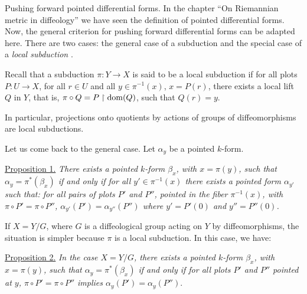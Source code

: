 \begin{Article}{Pushing forward pointed differential forms.}{}
  In the chapter ``On Riemannian metric in diffeology'' we have seen the definition of pointed differential forms.
  Now,
  the general criterion for pushing forward differential forms can be adapted here.
  There are two cases:
  the general %
  case of a subduction and the special case of a \emph{local subduction} \cite[\textsection\,2.16]{PIZ13}.
  
  Recall that a subduction $\pi \colon Y \to X$ is said to be a local subduction if for all plots $P \colon U \to X$,
  for all $r \in U$ and all $y \in \pi^{-1}(x)$,
  $x = P(r)$,
  there exists a local lift $Q$ in $Y$,
  that is,
  $\pi \circ Q = P \restriction \mathrm{dom}(Q)$,
  such that $Q(r) = y$.
  
  In particular,
  projections onto quotients by actions of groups of diffeomorphisms are local subductions.
  
  Let us come back to the general case.
  Let $\alpha_y$ be a pointed $k$-form.
  
  \uline{Proposition 1.} {\itshape There exists a pointed $k$-form $\beta_x$,
  with $x = \pi(y)$,
  such that $\alpha_y = \pi^*(\beta_x)$ if and only if for all $y' \in \pi^{-1}(x)$ there exists a pointed form $\alpha_{y'}$ such that:
  for all pairs of plots $P'$ and $P''$,
  pointed in the fiber $\pi^{-1}(x)$,
  with $\pi \circ P' = \pi \circ P''$,
  $\alpha_{y'}(P') = \alpha_{y''}(P'')$ where $y' = P'(0)$ and $y'' = P''(0)$.}
  
  If $X = Y/G$,
  where $G$ is a diffeological group acting on $Y$ by diffeomorphisms,
  the situation is simpler because $\pi$ is a local subduction.
  In this case,
  we have:
  
  \uline{Proposition 2.} {\itshape In the case $X = Y/G$,
  there exists a pointed $k$-form $\beta_x$,
  with $x = \pi(y)$,
  such that $\alpha_y = \pi^*(\beta_x)$ if and only if for all plots $P'$ and $P''$ pointed at $y$,
  $\pi \circ P' = \pi \circ P''$ implies $\alpha_y(P') = \alpha_y(P'').$}
\end{Article}

